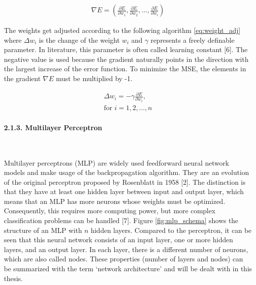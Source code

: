 \documentclass[
]{article}
\begin{document}
\begin{align} \label{eq:gradient_descent}
\nabla{E}=(\frac{\partial E}{\partial w_{1}},
\frac{\partial E}{\partial w_{2}},
\dots,
\frac{\partial E}{\partial w_{i}})
\end{align}

The weights get adjusted according to the following algorithm
\ref{eq:weight_adj} where \(\Delta{w_{i}}\) is the change of the weight
\(w_{i}\) and \(\gamma\) represents a freely definable parameter. In
literature, this parameter is often called learning constant {[}6{]}.
The negative value is used because the gradient naturally points in the
direction with the largest increase of the error function. To minimize
the MSE, the elements in the gradient \(\nabla{E}\) must be multiplied
by -1.

\begin{align} \label{eq:weight_adj}
\Delta{w_{i}}=-\gamma\frac{\partial E}{\partial w_{i}}, \\
\text{for } i=1,2,\dots,n \nonumber
\end{align}

\newpage

\hypertarget{MLP}{%
\paragraph{2.1.3. Multilayer Perceptron}\label{MLP}}

~

Multilayer perceptrons (MLP) are widely used feedforward neural network
models and make usage of the backpropagation algorithm. They are an
evolution of the original perceptron proposed by Rosenblatt in 1958
{[}2{]}. The distinction is that they have at least one hidden layer
between input and output layer, which means that an MLP has more neurons
whose weights must be optimized. Consequently, this requires more
computing power, but more complex classification problems can be handled
{[}7{]}. Figure \ref{fig:mlp_schema} shows the structure of an MLP with
\(n\) hidden layers. Compared to the perceptron, it can be seen that
this neural network consists of an input layer, one or more hidden
layers, and an output layer. In each layer, there is a different number
of neurons, which are also called nodes. These properties (number of
layers and nodes) can be summarized with the term `network architecture'
and will be dealt with in this thesis.

~
\end{document}
